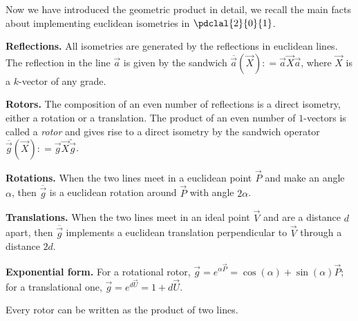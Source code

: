 \documentclass{birkjour}
\newcommand{\fvsh}[2]{\ifthenelse{\equal{\isFV}{true}}{#1}{#2}}
\newcommand{\mydogblue}{{\color{gray} $\square$~~}}
\begin{document}
{
Now we have introduced the geometric product in detail, we recall the main facts about implementing euclidean isometries  in $\pdclal{2}{0}{1}$.  
\begin{compactenum}
\item \textbf{Reflections.}  All isometries are generated by the reflections in euclidean lines.  The reflection in the line $\vec{a}$ is given by the sandwich $\overline{\vec{a}}(\vec{X}) : =  \vec{a}\vec{X} \vec{a}$, where $\vec{X}$  is a $k$-vector of any grade.
\item \textbf{Rotors.} The composition of an even number of reflections is a direct isometry, either a rotation or a translation.  The product of an even number of $1$-vectors  is called a \emph{rotor} and gives rise to a direct isometry  by the sandwich operator $\overline{\vec{g}}(\vec{X}) : =  \vec{g}\vec{X} \widetilde{\vec{g}}$. 
\item \textbf{Rotations.}  When the two lines meet in a euclidean point $\vec{P}$ and make an angle $\alpha$, then $\overline{\vec{g}}$ is a euclidean rotation around $\vec{P}$ with angle $2 \alpha$.   
\item \textbf{Translations.} When the two lines meet in an ideal point $\vec{V}$ and are a distance $d$ apart, then $\overline{\vec{g}}$ implements a euclidean translation perpendicular to $\vec{V}$ through a distance $2d$.  
\item \textbf{Exponential form.} For a rotational rotor,  $\vec{g} = e^{{\alpha \vec{P}}} = \cos{(\alpha)} + \sin{(\alpha)} \vec{P}$; for a translational one, $\vec{g} = e^{{d \vec{U}}} = 1 + d \vec{U}$.
\end{compactenum}
\myexercise  Every rotor can be written as the product of two lines. %

}

\end{document}
